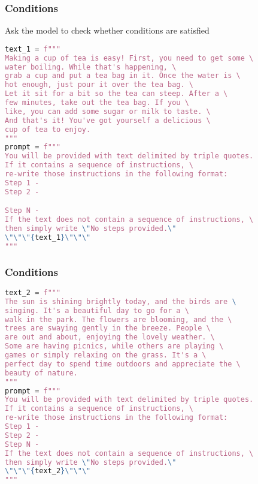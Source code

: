 \begin{frame}[fragile]\frametitle{Conditions}

Ask the model to check whether conditions are satisfied

{\tiny
\begin{lstlisting}[language=Python]
text_1 = f"""
Making a cup of tea is easy! First, you need to get some \ 
water boiling. While that's happening, \ 
grab a cup and put a tea bag in it. Once the water is \ 
hot enough, just pour it over the tea bag. \ 
Let it sit for a bit so the tea can steep. After a \ 
few minutes, take out the tea bag. If you \ 
like, you can add some sugar or milk to taste. \ 
And that's it! You've got yourself a delicious \ 
cup of tea to enjoy.
"""
prompt = f"""
You will be provided with text delimited by triple quotes. 
If it contains a sequence of instructions, \ 
re-write those instructions in the following format:
Step 1 -
Step 2 -

Step N -
If the text does not contain a sequence of instructions, \ 
then simply write \"No steps provided.\"
\"\"\"{text_1}\"\"\"
"""
\end{lstlisting}
}
		
\end{frame}


\begin{frame}[fragile]\frametitle{Conditions}

{\tiny 
\begin{lstlisting}[language=Python]
text_2 = f"""
The sun is shining brightly today, and the birds are \
singing. It's a beautiful day to go for a \ 
walk in the park. The flowers are blooming, and the \ 
trees are swaying gently in the breeze. People \ 
are out and about, enjoying the lovely weather. \ 
Some are having picnics, while others are playing \ 
games or simply relaxing on the grass. It's a \ 
perfect day to spend time outdoors and appreciate the \ 
beauty of nature.
"""
prompt = f"""
You will be provided with text delimited by triple quotes. 
If it contains a sequence of instructions, \ 
re-write those instructions in the following format:
Step 1 - 
Step 2 -
Step N -
If the text does not contain a sequence of instructions, \ 
then simply write \"No steps provided.\"
\"\"\"{text_2}\"\"\"
"""
\end{lstlisting}
}
		
\end{frame}

